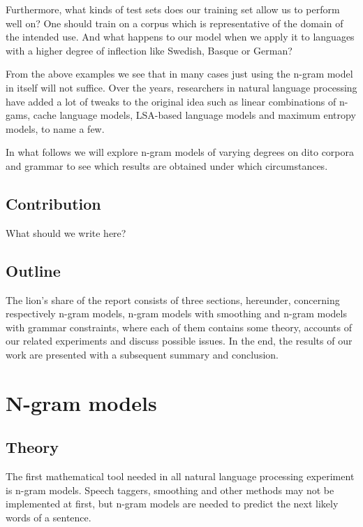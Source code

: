 \documentclass[a4paper,12pt]{article}
\begin{document}
Furthermore, what kinds of test sets does our training set allow us to perform well on? One should train on a  corpus which is representative of the domain of the intended use. And what happens to our model when we apply it to languages with a higher degree of inflection like Swedish, Basque or German?

From the above examples we see that in many cases just using the n-gram model in itself will not suffice. Over the years, researchers in natural language processing have added a lot of tweaks to the original idea such as linear combinations of n-gams, cache language models, LSA-based language models and maximum entropy models, to name a few.

In what follows we will explore n-gram models of varying degrees on dito corpora and grammar to see which results are obtained under which circumstances.

\subsection{Contribution}
What should we write here?

\subsection{Outline}
The lion's share of the report consists of three sections, hereunder, concerning respectively n-gram models, n-gram models with smoothing and n-gram models with grammar constraints, where each of them contains some theory, accounts of our related experiments and discuss possible issues. In the end, the results of our work are presented with a subsequent summary and conclusion.

\section{N-gram models}
\label{sec:ngram}

\subsection{Theory}
The first mathematical tool needed in all natural language processing experiment is n-gram models. Speech taggers, smoothing and other methods may not be implemented at first, but n-gram models are needed to predict the next likely words of a sentence.
\end{document}
